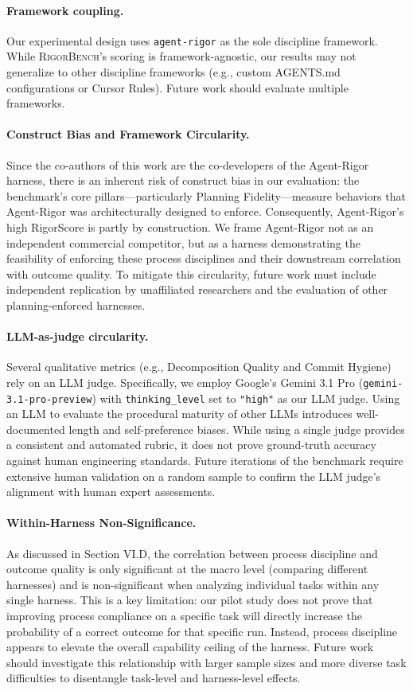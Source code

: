 \documentclass[letterpaper, 10 pt, conference]{ieeeconf}
\newcommand{\bench}{\textsc{RigorBench}}
\newcommand{\rigor}{\texttt{agent-rigor}}
\begin{document}
\paragraph{Framework coupling.}
Our experimental design uses \rigor{} as the sole discipline framework.
While \bench{}'s scoring is framework-agnostic, our results may not generalize to other discipline frameworks (e.g., custom AGENTS.md configurations or Cursor Rules).
Future work should evaluate multiple frameworks.

\paragraph{Construct Bias and Framework Circularity.}
Since the co-authors of this work are the co-developers of the Agent-Rigor harness, there is an inherent risk of construct bias in our evaluation: the benchmark's core pillars—particularly Planning Fidelity—measure behaviors that Agent-Rigor was architecturally designed to enforce. Consequently, Agent-Rigor's high RigorScore is partly by construction. We frame Agent-Rigor not as an independent commercial competitor, but as a harness demonstrating the feasibility of enforcing these process disciplines and their downstream correlation with outcome quality. To mitigate this circularity, future work must include independent replication by unaffiliated researchers and the evaluation of other planning-enforced harnesses.

\paragraph{LLM-as-judge circularity.}
Several qualitative metrics (e.g., Decomposition Quality and Commit Hygiene) rely on an LLM judge. Specifically, we employ Google's Gemini 3.1 Pro (\texttt{gemini-3.1-pro-preview}) with \texttt{thinking\_level} set to \texttt{"high"} as our LLM judge. Using an LLM to evaluate the procedural maturity of other LLMs introduces well-documented length and self-preference biases. While using a single judge provides a consistent and automated rubric, it does not prove ground-truth accuracy against human engineering standards. Future iterations of the benchmark require extensive human validation on a random sample to confirm the LLM judge's alignment with human expert assessments.

\paragraph{Within-Harness Non-Significance.}
As discussed in Section VI.D, the correlation between process discipline and outcome quality is only significant at the macro level (comparing different harnesses) and is non-significant when analyzing individual tasks within any single harness. This is a key limitation: our pilot study does not prove that improving process compliance on a specific task will directly increase the probability of a correct outcome for that specific run. Instead, process discipline appears to elevate the overall capability ceiling of the harness. Future work should investigate this relationship with larger sample sizes and more diverse task difficulties to disentangle task-level and harness-level effects.
\end{document}
